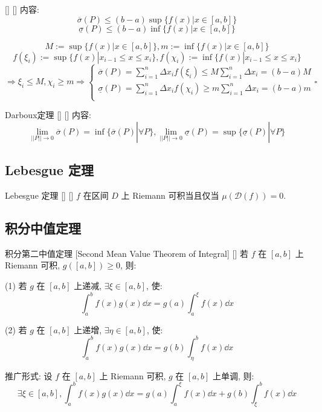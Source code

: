 \documentclass[UTF8]{ctexart}
\begin{document}
            \begin{ppt}
			    []
			    {}
			    []
			    []
                内容: 
                \[\overline{\sigma}(P)\leq(b-a)\sup\{f(x)|x\in[a,b]\}\]
                \[\underline{\sigma}(P)\leq(b-a)\inf\{f(x)|x\in[a,b]\}\]
            \end{ppt}

            \begin{prf}
                \[M:=\sup\{f(x)|x\in[a,b]\},m:=\inf\{f(x)|x\in[a,b]\}\]
                \[f(\xi_i):=\sup\{f(x)|x_{i-1}\leq x\leq x_i\}, f(\chi_i):=\inf\{f(x)|x_{i-1}\leq x\leq x_i\}\]
                \[\Longrightarrow\xi_i\leq M, \chi_i\geq m\Longrightarrow
                \begin{cases}
                    \overline{\sigma}(P)=\sum\limits_{i=1}^{n}\Delta x_if(\xi_i)\leq M\sum\limits_{i=1}^{n}\Delta x_i=(b-a)M\\
                    \underline{\sigma}(P)=\sum\limits_{i=1}^{n}\Delta x_if(\chi_i)\geq m\sum\limits_{i=1}^{n}\Delta x_i=(b-a)m\\
                \end{cases}\square\]
            \end{prf}
			
			\begin{thm}
			    []
			    {Darboux定理}
			    []
			    []
				内容: 
				\[\lim_{||P||\to 0}\overline{\sigma}(P)=\inf\{\overline{\sigma}(P)|\forall P\}, \lim_{||P||\to 0}\underline{\sigma}(P)=\sup\{\underline{\sigma}(P)|\forall P\}\]
			\end{thm}

        \subsection{Lebesgue 定理}
            
            \begin{thm}
			    []
			    {Lebesgue 定理}
			    []
			    []
                \(f\) 在区间 \(D\) 上 Riemann 可积当且仅当 \(\mu(\mathcal{D}(f))=0\). 
            \end{thm}

        \subsection{积分中值定理}
			
			\begin{thm}
			    []
			    {积分第二中值定理 }
			    [Second Mean Value Theorem of Integral]
			    []
				若 \(f\) 在 \([a,b]\) 上 Riemann 可积, \(g([a,b])\geq 0\), 则: 
				
				(1) 若 \(g\) 在 \([a,b]\) 上递减, \(\exists\xi\in[a,b]\), 使: 
				\[\int_a^b f(x)g(x)\dd x=g(a)\int_a^\xi f(x)\dd x\]

				(2) 若 \(g\) 在 \([a,b]\) 上递增, \(\exists\eta\in[a,b]\), 使: 
				\[\int_a^b f(x)g(x)\dd x=g(b)\int_\eta^b f(x)\dd x\]

			    {}
			    {推广形式: }
			    {}
			    {}
				设 \(f\) 在 \([a,b]\) 上 Riemann 可积, \(g\) 在 \([a,b]\) 上单调, 则: 
				\[\exists\xi\in[a,b], \int_a^b f(x)g(x)\dd x=g(a)\int_a^\xi f(x)\dd x+g(b)\int_\xi^b f(x)\dd x\]
			\end{thm}
\end{document}
